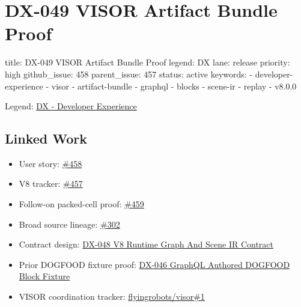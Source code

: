 \chapter{DX-049 VISOR Artifact Bundle Proof}\label{record-145}

\smallskip

\begin{RecordMeta}
title: DX-049 VISOR Artifact Bundle Proof
legend: DX
lane: release
priority: high
github_issue: 458
parent_issue: 457
status: active
keywords:
  - developer-experience
  - visor
  - artifact-bundle
  - graphql
  - blocks
  - scene-ir
  - replay
  - v8.0.0

\end{RecordMeta}

Legend: \href{https://github.com/flyingrobots/bijou/blob/1853ad902f6bf219326409e7f743a5a1d6517dbc/docs/legends/DX-developer-experience.md}{DX - Developer Experience}

\section{Linked Work}\label{record-145-linked-work}

\begin{itemize}
\tightlist
\item
  User story: \href{https://github.com/flyingrobots/bijou/issues/458}{\#458}
\item
  V8 tracker: \href{https://github.com/flyingrobots/bijou/issues/457}{\#457}
\item
  Follow-on packed-cell proof: \href{https://github.com/flyingrobots/bijou/issues/459}{\#459}
\item
  Broad source lineage: \href{https://github.com/flyingrobots/bijou/issues/302}{\#302}
\item
  Contract design: \href{https://github.com/flyingrobots/bijou/blob/cbd70612140e7a450d764b3c7be1c6af878b99bc/docs/design/DX-048-v8-runtime-graph-scene-ir-contract.md}{DX-048 V8 Runtime Graph And Scene IR Contract}
\item
  Prior DOGFOOD fixture proof: \href{https://github.com/flyingrobots/bijou/blob/cbd70612140e7a450d764b3c7be1c6af878b99bc/docs/design/DX-046-graphql-authored-dogfood-block-fixture.md}{DX-046 GraphQL Authored DOGFOOD Block Fixture}
\item
  VISOR coordination tracker: \href{https://github.com/flyingrobots/visor/issues/1}{flyingrobots/visor\#1}
\end{itemize}

